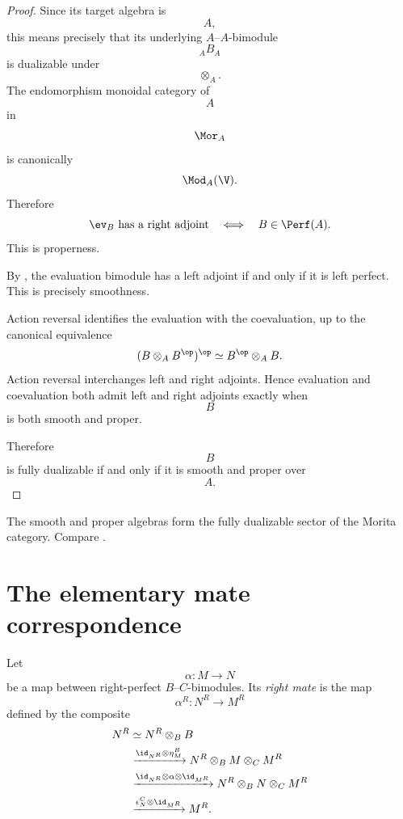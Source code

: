\begin{proof}
Since its target algebra is
\[
    A,
\]
this means precisely that its underlying $A$--$A$-bimodule
\[
    {}_A B_A
\]
is dualizable under
\[
    \otimes_A.
\]
The endomorphism monoidal category of
\[
    A
\]
in
\[
    \Mor_A
\]
is canonically
\[
    \Mod_A(\V).
\]
Therefore
\[
    \ev_B
    \text{ has a right adjoint}
    \quad\Longleftrightarrow\quad
    B\in\Perf(A).
\]
This is properness.

By
,
the evaluation bimodule has a left adjoint if and only if it is left
perfect. This is precisely smoothness.

Action reversal identifies the evaluation with the coevaluation, up to
the canonical equivalence
\[
    (B\otimes_A B^{\op})^{\op}
    \simeq
    B^{\op}\otimes_A B.
\]
Action reversal interchanges left and right adjoints. Hence evaluation
and coevaluation both admit left and right adjoints exactly when
\[
    B
\]
is both smooth and proper.

Therefore
\[
    B
\]
is fully dualizable if and only if it is smooth and proper over
\[
    A.
\]
\end{proof}

\begin{remark}
\label{rem:smooth-proper-full-dualizable}
The smooth and proper algebras form the fully dualizable sector of the
Morita category. Compare
\cite{ToenDerivedMorita,HaugsengHigherMorita}.
\end{remark}

\section{The elementary mate correspondence}
\label{sec:elementary-mate-correspondence}

\begin{definition}
\label{def:right-mate}
Let
\[
    \alpha
    \colon
    M
    \longrightarrow
    N
\]
be a map between right-perfect $B$--$C$-bimodules. Its \emph{right mate}
is the map
\[
    \alpha^R
    \colon
    N^R
    \longrightarrow
    M^R
\]
defined by the composite
\[
\begin{aligned}
    N^R
    &\simeq
    N^R\otimes_B B
    \\
    &\xrightarrow{
        \id_{N^R}\otimes\eta_M^{B}
    }
    N^R\otimes_B M\otimes_C M^R
    \\
    &\xrightarrow{
        \id_{N^R}\otimes\alpha\otimes\id_{M^R}
    }
    N^R\otimes_B N\otimes_C M^R
    \\
    &\xrightarrow{
        \epsilon_N^{C}\otimes\id_{M^R}
    }
    M^R.
\end{aligned}
\]
\end{definition}

